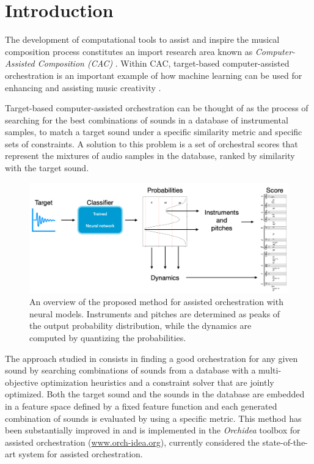 \documentclass[runningheads,a4paper]{llncs}
\begin{document}
\section{Introduction}\label{sec:introduction}

The development of computational tools to assist and inspire the musical composition process constitutes an import research area known as \emph{Computer-Assisted Composition (CAC)} \cite{FerVic2013, Ari2005}. Within CAC, target-based computer-assisted orchestration is an important example of how machine learning can be used for {enhancing} and {assisting} music creativity \cite{Maresz2003}. 

Target-based computer-assisted orchestration can be thought of as the process of searching for the best combinations of sounds in a database of instrumental samples, to match a target sound under a specific similarity metric and specific sets of constraints. A solution to this problem is a set of orchestral scores that represent the mixtures of audio samples in the database, ranked by similarity with the target sound. 

\begin{figure}
	\centering
	\includegraphics[scale=0.17]{../latex/figs/method.png}
	\caption{An overview of the proposed method for assisted orchestration with neural models. Instruments and pitches are determined as peaks of the output probability distribution, while the dynamics are computed by quantizing the probabilities. \label{fig:method}}
\end{figure}

The approach studied in \cite{Carpentier2010} consists in finding a good orchestration for any given sound by searching combinations of sounds from a database with a multi-objective optimization heuristics and a constraint solver that are jointly optimized. Both the target sound and the sounds in the database are embedded in a feature space defined by a fixed feature function and each generated combination of sounds is evaluated by using a specific metric. This method has been substantially improved in \cite{Cella18, Cella2020} and is implemented in the \emph{Orchidea} toolbox for assisted orchestration (\url{www.orch-idea.org}), currently considered the state-of-the-art system for assisted orchestration.
\end{document}
